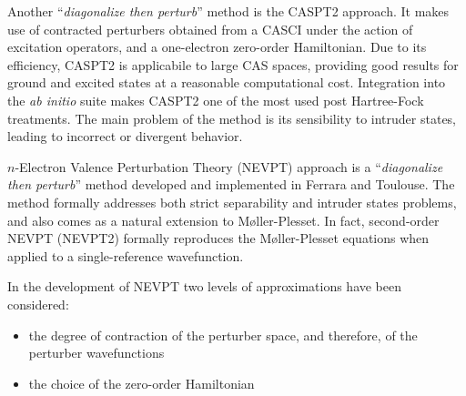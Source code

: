 Another ``\textit{diagonalize then perturb}'' method is the CASPT2
approach\cite{jpc-94-5483-1990,jcp-96-1218-1992}. It makes use of contracted
perturbers obtained from a CASCI under the action of excitation operators,
and a one-electron zero-order Hamiltonian. Due to its efficiency, CASPT2 is
applicabile to large CAS spaces, providing good results for ground and
excited states at a reasonable computational cost. Integration into
the \textit{ab initio} suite \molcas makes CASPT2 one of the most used post
Hartree-Fock treatments.  The main problem of the method is its sensibility
to intruder states, leading to incorrect or divergent behavior. 

$n$-Electron Valence Perturbation Theory (NEVPT) approach
\cite{jcp-114-10252-2001,jcp-117-9138-2002,cpl-350-297-2001} is a
``\textit{diagonalize then perturb}'' method developed and implemented in
Ferrara and Toulouse. The method formally addresses both strict separability
and intruder states problems, and also comes as a natural extension to
M{\o}ller-Plesset. In fact, second-order NEVPT (NEVPT2) formally reproduces
the M{\o}ller-Plesset equations when applied to a single-reference
wavefunction.

In the development of NEVPT two levels of approximations have been
considered:
\begin{itemize}
\item the degree of contraction of the perturber space, and therefore, of
the perturber wavefunctions
\item the choice of the zero-order Hamiltonian
\end{itemize}









